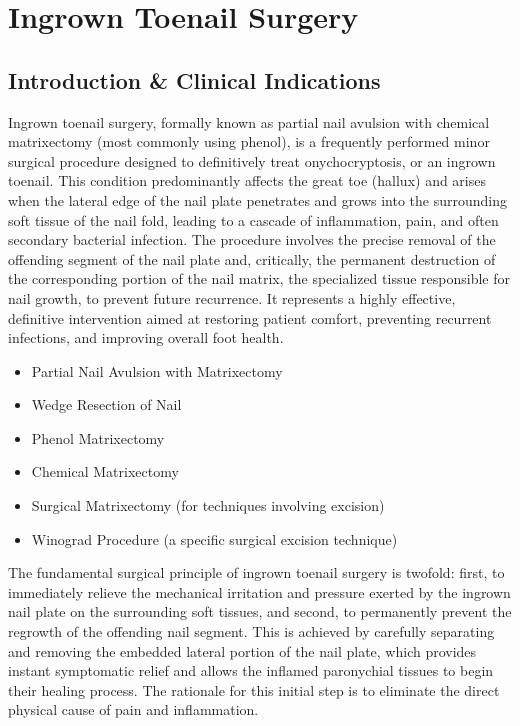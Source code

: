 \chapter{Ingrown Toenail Surgery}

\section*{Introduction \& Clinical Indications}
Ingrown toenail surgery, formally known as partial nail avulsion with chemical matrixectomy (most commonly using phenol), is a frequently performed minor surgical procedure designed to definitively treat onychocryptosis, or an ingrown toenail. This condition predominantly affects the great toe (hallux) and arises when the lateral edge of the nail plate penetrates and grows into the surrounding soft tissue of the nail fold, leading to a cascade of inflammation, pain, and often secondary bacterial infection. The procedure involves the precise removal of the offending segment of the nail plate and, critically, the permanent destruction of the corresponding portion of the nail matrix, the specialized tissue responsible for nail growth, to prevent future recurrence. It represents a highly effective, definitive intervention aimed at restoring patient comfort, preventing recurrent infections, and improving overall foot health.

\begin{itemize}
  \item Partial Nail Avulsion with Matrixectomy
  \item Wedge Resection of Nail
  \item Phenol Matrixectomy
  \item Chemical Matrixectomy
  \item Surgical Matrixectomy (for techniques involving excision)
  \item Winograd Procedure (a specific surgical excision technique)
\end{itemize}

The fundamental surgical principle of ingrown toenail surgery is twofold: first, to immediately relieve the mechanical irritation and pressure exerted by the ingrown nail plate on the surrounding soft tissues, and second, to permanently prevent the regrowth of the offending nail segment. This is achieved by carefully separating and removing the embedded lateral portion of the nail plate, which provides instant symptomatic relief and allows the inflamed paronychial tissues to begin their healing process. The rationale for this initial step is to eliminate the direct physical cause of pain and inflammation.

